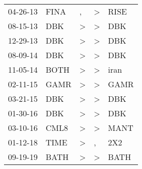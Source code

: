 \begin{supertabular}{lllll}
 04-26-13 &  FINA &             , &  \textgreater &  RISE \\
 08-15-13 &   DBK &  \textgreater &  \textgreater &   DBK \\
 12-29-13 &   DBK &  \textgreater &  \textgreater &   DBK \\
 08-09-14 &   DBK &  \textgreater &  \textgreater &   DBK \\
 11-05-14 &  BOTH &  \textgreater &  \textgreater &  iran \\
 02-11-15 &  GAMR &  \textgreater &  \textgreater &  GAMR \\
 03-21-15 &   DBK &  \textgreater &  \textgreater &   DBK \\
 01-30-16 &   DBK &  \textgreater &  \textgreater &   DBK \\
 03-10-16 &  CML8 &  \textgreater &  \textgreater &  MANT \\
 01-12-18 &  TIME &  \textgreater &             , &   2X2 \\
 09-19-19 &  BATH &  \textgreater &  \textgreater &  BATH \\
\end{supertabular}
